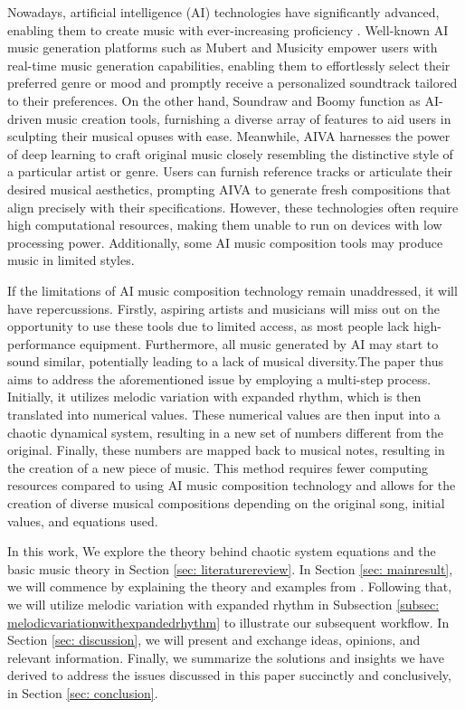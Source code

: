 \documentclass[11pt]{article}
\begin{document}
Nowadays, artificial intelligence (AI) technologies have significantly advanced, enabling them to create music with ever-increasing proficiency \cite{bonnici_music_2021}. 
Well-known AI music generation platforms such as  Mubert \cite{mubert_website} and 
Musicity \cite{musicfy_website} empower users with real-time music generation capabilities, 
enabling them to effortlessly select their preferred genre or mood and promptly receive a personalized soundtrack tailored to their preferences. On the other hand, Soundraw \cite{soundraw_website} and Boomy \cite{boomy_website} function as AI-driven music creation tools, furnishing a diverse array of features to aid users in sculpting their musical opuses with ease. Meanwhile, AIVA \cite{aiva_website} harnesses the power of deep learning to craft original music closely resembling the distinctive style of a particular artist or genre. Users can furnish reference tracks or articulate their desired musical aesthetics, prompting AIVA to generate fresh compositions that align precisely with their specifications. However, these technologies often require high computational resources, making them unable to run on devices with low processing power. Additionally, some AI music composition tools may produce music in limited styles.

If the limitations of AI music composition technology remain unaddressed, it will have repercussions. Firstly, aspiring artists and musicians will miss out on the opportunity to use these tools due to limited access, as most people lack high-performance equipment. Furthermore, all music generated by AI may start to sound similar, potentially leading to a lack of musical diversity.The paper thus aims to address the aforementioned issue by employing a multi-step process. Initially, it utilizes melodic variation with expanded rhythm, which is then translated into numerical values. These numerical values are then input into a chaotic dynamical system, resulting in a new set of numbers different from the original. Finally, these numbers are mapped back to musical notes, resulting in the creation of a new piece of music. This method requires fewer computing resources compared to using AI music composition technology and allows for the creation of diverse musical compositions depending on the original song, initial values, and equations used.

In this work, We explore the theory behind chaotic system equations and the basic music theory in Section \ref{sec: literaturereview}. In Section \ref{sec: mainresult}, we will commence by explaining the theory and examples from \cite{dabby_musical_1996}. Following that, we will utilize melodic variation with expanded rhythm in Subsection \ref{subsec: melodicvariationwithexpandedrhythm} to illustrate our subsequent workflow. In Section \ref{sec: discussion}, we will present and exchange ideas, opinions, and relevant information. Finally,  we summarize the solutions and insights we have derived to address the issues discussed in this paper succinctly and conclusively, in Section \ref{sec: conclusion}.
\end{document}
